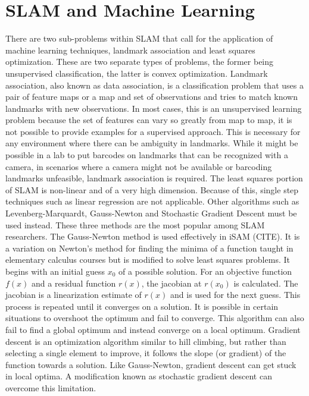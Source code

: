 \documentclass[12pt]{report}
\begin{document}
\section{SLAM and Machine Learning}
	There are two sub-problems within SLAM that call for the application of machine learning techniques, landmark association and least squares optimization.  These are two separate types of problems, the former being unsupervised classification, the latter is convex optimization.
Landmark association, also known as data association, is a classification problem that uses a pair of feature maps or a map and set of observations and tries to match known landmarks with new observations.  In most cases, this is an unsupervised learning problem because the set of features can vary so greatly from map to map, it is not possible to provide examples for a supervised approach.  This is necessary for any environment where there can be ambiguity in landmarks.  While it might be possible in a lab to put barcodes on landmarks that can be recognized with a camera, in scenarios where a camera might not be available or barcoding landmarks unfeasible, landmark association is required.
The least squares portion of SLAM is non-linear and of a very high dimension.  Because of this, single step techniques such as linear regression are not applicable.  Other algorithms such as Levenberg-Marquardt, Gauss-Newton and Stochastic Gradient Descent must be used instead.  These three methods are the most popular among SLAM researchers.  
	The Gauss-Newton method is used effectively in iSAM (CITE).  It is a variation on Newton’s method for finding the minima of a function taught in elementary calculus courses but is modified to solve least squares problems.  It begins with an initial guess $x_0$ of a possible solution.  For an objective function $f(x)$ and a residual function $r(x)$, the jacobian at $r(x_0)$ is calculated.  The jacobian is a linearization estimate of $r(x)$ and is used for the next guess.  This process is repeated until it converges on a solution.  It is possible in certain situations to overshoot the optimum and fail to converge.  This algorithm can also fail to find a global optimum and instead converge on a local optimum.
	Gradient descent is an optimization algorithm similar to hill climbing, but rather than selecting a single element to improve, it follows the slope (or gradient) of the function towards a solution.  Like Gauss-Newton, gradient descent can get stuck in local optima.  A modification known as stochastic gradient descent can overcome this limitation.  
\end{document}
